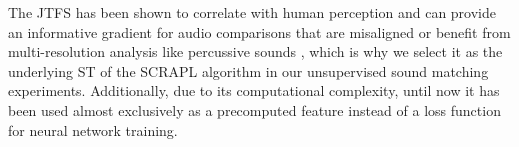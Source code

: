 \documentclass{article} %
\theoremstyle{plain}
\theoremstyle{definition}
\theoremstyle{remark}
\begin{document}
The JTFS has been shown to correlate with human perception \citep{lostanlen2021time,tian2025assessing} and can provide an informative gradient for audio comparisons that are misaligned \citep{vahidi2023mesostructures} or benefit from multi-resolution analysis like percussive sounds \citep{han2024learning}, which is why we select it as the underlying ST of the SCRAPL algorithm in our unsupervised sound matching experiments.
Additionally, due to its computational complexity, until now it has been used almost exclusively as a precomputed feature instead of a loss function for neural network training.


\end{document}
